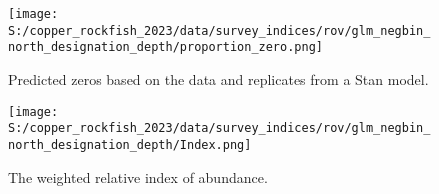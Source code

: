 \documentclass[11pt,
  english,
  letterpaper,
]{article}
\begin{document}
\newpage

\begin{figure}
\centering
\texttt{[image: S:/copper\_rockfish\_2023/data/survey\_indices/rov/glm\_negbin\_north\_designation\_depth/proportion\_zero.png]}
\caption{Predicted zeros based on the data and replicates from a Stan model.\label{fig:rov-prop-zero}}
\end{figure}

\newpage

\begin{figure}
\centering
\texttt{[image: S:/copper\_rockfish\_2023/data/survey\_indices/rov/glm\_negbin\_north\_designation\_depth/Index.png]}
\caption{The weighted relative index of abundance.\label{fig:rov-index}}
\end{figure}
\end{document}
